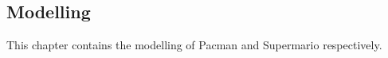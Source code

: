 

\subsection{Modelling}

This chapter contains the modelling of Pacman and Supermario respectively. 




